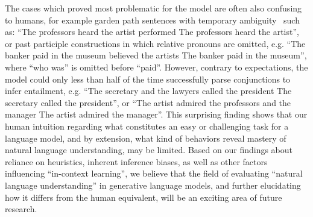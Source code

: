 \documentclass[11pt]{article}
\begin{document}
The cases which proved most problematic for the model are often also confusing to humans, for example garden path sentences with temporary ambiguity~\cite{frazier_sausage_1978} such as: ``The professors heard the artist performed  The professors heard the artist'', or past participle constructions in which relative pronouns are omitted, e.g. ``The banker paid in the museum believed the artists  The banker paid in the museum'', where ``who was'' is omitted before ``paid''. However, contrary to expectations, the model could only less than half of the time successfully parse conjunctions to infer entailment, e.g. ``The secretary and the lawyers called the president  The secretary called the president'', or ``The artist admired the professors and the manager  The artist admired the manager''. This surprising finding shows that our human intuition regarding what constitutes an easy or challenging task for a language model, and by extension, what kind of behaviors reveal mastery of natural language understanding, may be limited. Based on our findings about reliance on heuristics, inherent inference biases, as well as other factors influencing ``in-context learning'', we believe that the field of evaluating ``natural language understanding'' in generative language models, and further elucidating how it differs from the human equivalent, will be an exciting area of future research.
\end{document}
